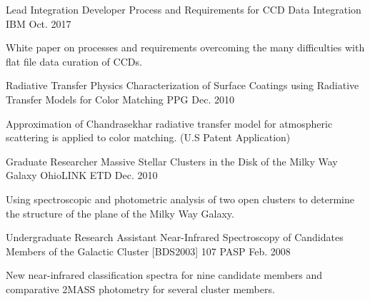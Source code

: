 

\begin{cventries}

  \cventry
    {Lead Integration Developer} %
    {Process and Requirements for CCD Data Integration} %
    {IBM} %
    {Oct. 2017} %
    {
      \begin{cvitems} %
        \item {White paper on processes and requirements overcoming the many difficulties with flat file data curation of CCDs.}
      \end{cvitems}
    }

  \cventry
    {Radiative Transfer Physics} %
    {Characterization of Surface Coatings using Radiative Transfer Models for Color Matching} %
    {PPG} %
    {Dec. 2010} %
    {
      \begin{cvitems} %
        \item {Approximation of Chandrasekhar radiative transfer model for atmospheric scattering is applied to color matching.  (U.S Patent Application)}
      \end{cvitems}
    }

  \cventry
    {Graduate Researcher} %
    {Massive Stellar Clusters in the Disk of the Milky Way Galaxy} %
    {OhioLINK ETD} %
    {Dec. 2010} %
    {
      \begin{cvitems} %
        \item {Using spectroscopic and photometric analysis of two open clusters to determine the structure of the plane of the Milky Way Galaxy.}
      \end{cvitems}
    }

  \cventry
    {Undergraduate Research Assistant} %
    {Near-Infrared Spectroscopy of Candidates Members of the Galactic Cluster [BDS2003] 107} %
    {PASP} %
    {Feb. 2008} %
    {
      \begin{cvitems} %
        \item {New near-infrared classification spectra for nine candidate members and comparative 2MASS photometry for several cluster members.}
      \end{cvitems}
    }

\end{cventries}
